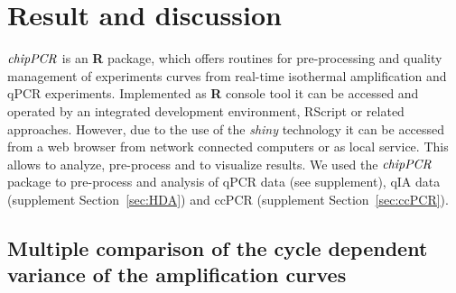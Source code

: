 \documentclass[twocolumn]{bmcart}%
\begin{document}
\section*{Result and discussion}

$\emph{chipPCR}$ is an \textbf{R} package, which offers routines for 
pre-processing and quality management of experiments curves from real-time 
isothermal amplification and qPCR experiments. Implemented as \textbf{R} 
console tool it can be accessed and operated by an integrated development 
environment, RScript or related approaches. However, due to the use of the 
\emph{shiny} technology it can be accessed from a web browser from network 
connected computers or as local service. This allows to analyze, pre-process 
and to visualize results. We used the $\emph{chipPCR}$ package to 
pre-process and analysis of qPCR data (see supplement), qIA 
data (supplement Section~\ref{sec:HDA}) and ccPCR (supplement 
Section~\ref{sec:ccPCR}).

\subsection*{Multiple comparison of the cycle dependent variance of the 
amplification curves}
\end{document}

